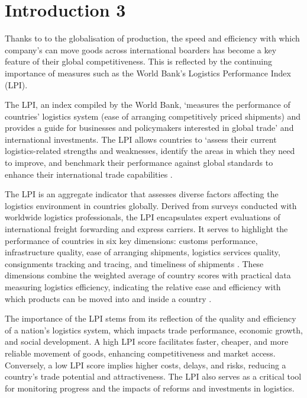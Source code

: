 \documentclass[sigconf]{acmart}
\begin{document}
\section{Introduction 3}
Thanks to to the globalisation of production, the speed and efficiency with which company’s can move goods across international boarders has become a key feature of their global competitiveness. This is reflected by the continuing importance of measures such as the World Bank’s Logistics Performance Index (LPI).

The LPI, an index compiled by the World Bank, ‘measures the performance of countries’ logistics system (ease of arranging competitively priced shipments) and provides a guide for businesses and policymakers interested in global trade’ and international investments. The LPI allows countries to ‘assess their current logistics-related strengths and weaknesses, identify the areas in which they need to improve, and benchmark their performance against global standards to enhance their international trade capabilities \cite{WBreport2018}.


The LPI is an aggregate indicator that assesses diverse factors affecting the logistics environment in countries globally. Derived from surveys conducted with worldwide logistics professionals, the LPI encapsulates expert evaluations of international freight forwarding and express carriers. It serves to highlight the performance of countries in six key dimensions: customs performance, infrastructure quality, ease of arranging shipments, logistics services quality, consignments tracking and tracing, and timeliness of shipments \cite{WBreport2018}. These dimensions combine the weighted average of country scores with practical data measuring logistics efficiency, indicating the relative ease and efficiency with which products can be moved into and inside a country \cite{WBreport2018}.

The importance of the LPI stems from its reflection of the quality and efficiency of a nation's logistics system, which impacts trade performance, economic growth, and social development. A high LPI score facilitates faster, cheaper, and more reliable movement of goods, enhancing competitiveness and market access. Conversely, a low LPI score implies higher costs, delays, and risks, reducing a country's trade potential and attractiveness. The LPI also serves as a critical tool for monitoring progress and the impacts of reforms and investments in logistics.
\end{document}
